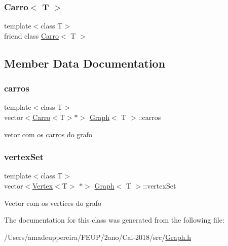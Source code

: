 \subsubsection{\texorpdfstring{Carro$<$ T $>$}{Carro< T >}}
{\footnotesize\ttfamily template$<$class T$>$ \\
friend class \mbox{\hyperlink{class_carro}{Carro}}$<$ T $>$\hspace{0.3cm}{\ttfamily [friend]}}



\subsection{Member Data Documentation}
\mbox{\label{class_graph_a4373274a6678e1b3a456f2ba32e64d69}} 
\subsubsection{\texorpdfstring{carros}{carros}}
{\footnotesize\ttfamily template$<$class T$>$ \\
vector$<$\mbox{\hyperlink{class_carro}{Carro}}$<$T$>$$\ast$$>$ \mbox{\hyperlink{class_graph}{Graph}}$<$ T $>$\+::carros\hspace{0.3cm}{\ttfamily [private]}}

vetor com os carros do grafo \mbox{\label{class_graph_a73d4e735fc0a7c83c9c689a2b53fa623}} 
\subsubsection{\texorpdfstring{vertex\+Set}{vertexSet}}
{\footnotesize\ttfamily template$<$class T$>$ \\
vector$<$\mbox{\hyperlink{class_vertex}{Vertex}}$<$T$>$ $\ast$$>$ \mbox{\hyperlink{class_graph}{Graph}}$<$ T $>$\+::vertex\+Set\hspace{0.3cm}{\ttfamily [private]}}

Vector com os vertices do grafo 

The documentation for this class was generated from the following file\+:\begin{DoxyCompactItemize}
\item 
/\+Users/amadeuppereira/\+F\+E\+U\+P/2ano/\+Cal-\/2018/src/\mbox{\hyperlink{_graph_8h}{Graph.\+h}}\end{DoxyCompactItemize}

